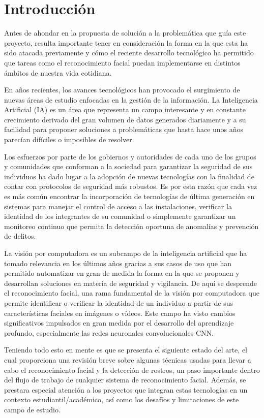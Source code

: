 \section{Introducción}


Antes de ahondar en la propuesta de solución a la problemática que guía este proyecto, resulta importante tener en consideración la forma en la que esta ha sido atacada previamente y cómo el reciente desarrollo tecnológico ha permitido que tareas como el reconocimiento facial puedan implementarse en distintos ámbitos de nuestra vida cotidiana.

En años recientes, los avances tecnológicos han provocado el surgimiento de nuevas áreas de estudio enfocadas en la gestión de la información. La Inteligencia Artificial (IA) es un área que representa un campo interesante y en constante crecimiento derivado del gran volumen de datos generados diariamente y a su facilidad para proponer soluciones a problemáticas que hasta hace unos años parecían difíciles o imposibles de resolver.

Los esfuerzos por parte de los gobiernos y autoridades de cada uno de los grupos y comunidades que conforman a la sociedad para garantizar la seguridad de sus individuos ha dado lugar a la adopción de nuevas tecnologías con la finalidad de contar con protocolos de seguridad más robustos. Es por esta razón que cada vez es más común encontrar la incorporación de tecnologías de última generación en sistemas para manejar el control de acceso a las instalaciones, verificar la identidad de los integrantes de su comunidad o simplemente garantizar un monitoreo continuo que permita la detección oportuna de anomalías y prevención de delitos.

La visión por computadora es un subcampo de la inteligencia artificial que ha tomado relevancia en los últimos años gracias a sus casos de uso que han permitido automatizar en gran de medida la forma en la que se proponen y desarrollan soluciones en materia de seguridad y vigilancia. De aquí se desprende el reconocimiento facial, una rama fundamental de la visión por computadora que permite identificar o verificar la identidad de un individuo a partir de sus características faciales en imágenes o vídeos.
Este campo ha visto cambios significativos impulsados en gran medida por el desarrollo del aprendizaje profundo, especialmente las redes neuronales convolucionales CNN.

Teniendo todo esto en mente es que se presenta el siguiente estado del arte, el cual proporciona una revisión breve sobre algunas técnicas usadas para llevar a cabo el reconocimiento facial y la detección de rostros, un paso importante dentro del flujo de trabajo de cualquier sistema de reconocimiento facial. Además, se prestara especial atención a los proyectos que integran estas tecnologías en un contexto estudiantil/académico, así como los desafíos y limitaciones de este campo de estudio.
